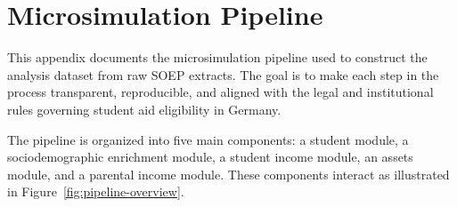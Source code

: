 


\newpage
\section{Microsimulation Pipeline}
\label{appendix:microsimulation-pipeline}

This appendix documents the microsimulation pipeline used to construct the analysis dataset from raw SOEP extracts. The goal is to make each step in the process transparent, reproducible, and aligned with the legal and institutional rules governing student aid eligibility in Germany.

The pipeline is organized into five main components: a student module, a sociodemographic enrichment module, a student income module, an assets module, and a parental income module. These components interact as illustrated in Figure~\ref{fig:pipeline-overview}.

